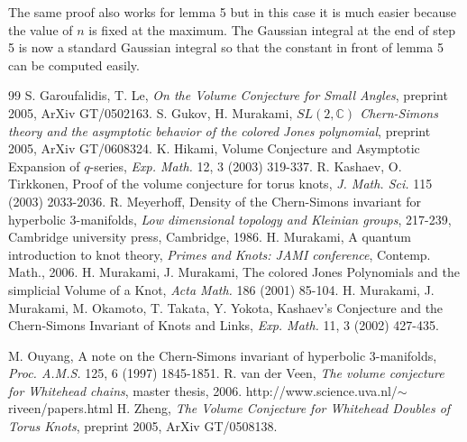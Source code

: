 \documentclass[letterpaper]{article}
\begin{document}
The same proof also works for lemma 5 but in this case it is much
easier because the value of $n$ is fixed at the maximum. The Gaussian integral at the end of step 5 is now a standard Gaussian integral so that the constant in front of lemma 5 can be computed easily.

\begin{thebibliography}{99}
\footnotesize
{} S. Garoufalidis, T. Le, \textit{On the Volume Conjecture for Small Angles}, preprint 2005, ArXiv GT/0502163.
 S. Gukov, H. Murakami, \textit{$SL(2,\mathbb{C})$ Chern-Simons theory and the asymptotic behavior of the colored Jones polynomial}, preprint 2005, ArXiv GT/0608324.
 K. Hikami, Volume Conjecture and Asymptotic Expansion of $q$-series, \textit{Exp. Math.} 12, 3 (2003) 319-337.
 R. Kashaev, O. Tirkkonen, Proof of the volume conjecture for torus knots, \textit{J. Math. Sci.} 115 (2003) 2033-2036.
 R. Meyerhoff, Density of the Chern-Simons invariant for hyperbolic 3-manifolds, \textit{Low dimensional topology and Kleinian groups}, 217-239, Cambridge university press, Cambridge, 1986.
 H. Murakami, A quantum introduction to knot theory, \textit{Primes and Knots: JAMI conference}, Contemp. Math., 2006.
 H. Murakami, J. Murakami, The colored Jones Polynomials and the simplicial Volume of a Knot, \textit{Acta Math.} 186 (2001) 85-104.
 H. Murakami, J. Murakami, M. Okamoto, T. Takata, Y. Yokota, Kashaev's Conjecture and the Chern-Simons Invariant of Knots and Links, \textit{Exp. Math.} 11, 3 (2002) 427-435.

 M. Ouyang, A note on the Chern-Simons invariant of hyperbolic 3-manifolds, \textit{Proc. A.M.S.} 125, 6 (1997) 1845-1851.
 R. van der Veen, \textit{The volume conjecture for Whitehead chains}, master thesis, 2006. http://www.science.uva.nl/$\sim$riveen/papers.html
 H. Zheng, \textit{The Volume Conjecture for Whitehead Doubles of Torus Knots}, preprint 2005, ArXiv GT/0508138.

\end{thebibliography}
\end{document}
